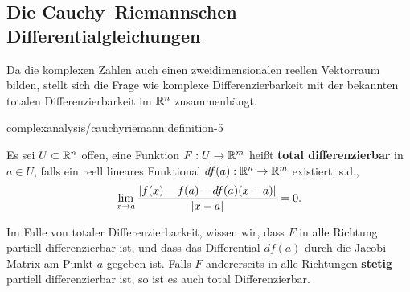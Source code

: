 \subsection{Die Cauchy–Riemannschen Differentialgleichungen}
\label{\detokenize{complexanalysis/cauchyriemann:die-cauchy-riemannschen-differentialgleichungen}}
\par
Da die komplexen Zahlen auch einen zweidimensionalen reellen Vektorraum bilden, stellt sich die Frage wie komplexe Differenzierbarkeit mit der bekannten totalen Differenzierbarkeit im \(\mathbb{R}^n\) zusammenhängt.
\begin{definition}{}{complexanalysis/cauchyriemann:definition-5}



\par
Es sei \(U\subset\mathbb{R}^n\) offen, eine Funktion \(F:U\to\mathbb{R}^m\) heißt \textbf{total differenzierbar} in \(a\in U\), falls ein reell lineares Funktional \(df(a):\mathbb{R}^n\to\mathbb{R}^m\) existiert, s.d.,
\begin{align*}
\lim_{x\to a} \frac{\vert f(x)-f(a) - df(a)(x-a) \vert}{\vert x-a \vert} = 0.
\end{align*}\end{definition}

\par
Im Falle von totaler Differenzierbarkeit, wissen wir, dass \(F\) in alle Richtung partiell differenzierbar ist, und dass das Differential \(df(a)\) durch die Jacobi Matrix am Punkt \(a\) gegeben ist. Falls \(F\) andererseits in alle Richtungen \textbf{stetig} partiell differenzierbar ist, so ist es auch total Differenzierbar.

